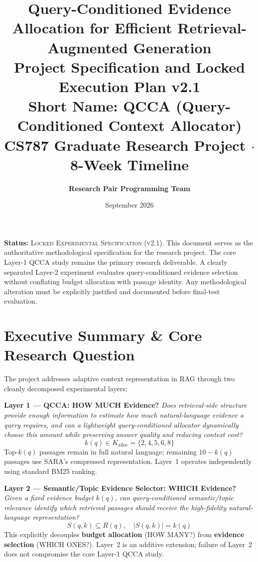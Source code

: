 \documentclass[11pt,a4paper]{article}
\title{
    \vspace{-1.5cm}
    \textbf{\Large Query-Conditioned Evidence Allocation for Efficient Retrieval-Augmented Generation} \\[0.3em]
    \large\textbf{Project Specification and Locked Execution Plan v2.1} \\[0.2em]
    \normalsize\textcolor{tealblue}{\textbf{Short Name: QCCA (Query-Conditioned Context Allocator)}} \\[0.1em]
    \small CS787 Graduate Research Project $\cdot$ 8-Week Timeline
}
\author{\textbf{Research Pair Programming Team}}
\date{September 2026}
\begin{document}
\maketitle
\vspace{-0.5cm}

\begin{statusbox}
\textbf{Status:} \textsc{Locked Experimental Specification (v2.1)}. This document serves as the authoritative methodological specification for the research project. The core Layer-1 QCCA study remains the primary research deliverable. A clearly separated Layer-2 experiment evaluates query-conditioned evidence selection without conflating budget allocation with passage identity. Any methodological alteration must be explicitly justified and documented before final-test evaluation.
\end{statusbox}

\section{Executive Summary \& Core Research Question}

\begin{summarybox}
The project addresses adaptive context representation in RAG through two cleanly decomposed experimental layers:
\vspace{0.3em}

\textbf{Layer 1 --- QCCA: HOW MUCH Evidence?}
\textit{Does retrieval-side structure provide enough information to estimate how much natural-language evidence a query requires, and can a lightweight query-conditioned allocator dynamically choose this amount while preserving answer quality and reducing context cost?}
\begin{equation*}
k(q) \in K_{\text{alloc}} = \{2, 4, 5, 6, 8\}
\end{equation*}
Top-$k(q)$ passages remain in full natural language; remaining $10 - k(q)$ passages use SARA's compressed representation. Layer~1 operates independently using standard BM25 ranking.

\vspace{0.3em}
\textbf{Layer 2 --- Semantic/Topic Evidence Selector: WHICH Evidence?}
\textit{Given a fixed evidence budget $k(q)$, can query-conditioned semantic/topic relevance identify which retrieved passages should receive the high-fidelity natural-language representation?}
\begin{equation*}
S(q, k) \subseteq R(q), \quad |S(q, k)| = k(q)
\end{equation*}
This explicitly decouples \textbf{budget allocation} (HOW MANY?) from \textbf{evidence selection} (WHICH ONES?). Layer~2 is an additive extension; failure of Layer~2 does not compromise the core Layer-1 QCCA study.
\end{summarybox}
\end{document}

